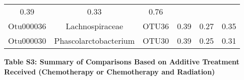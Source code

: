 \documentclass[12pt,]{article}
\begin{document}
\begin{longtable}[]{@{}cccccc@{}}
\begin{minipage}[t]{0.22\columnwidth}
0.39\strut
\end{minipage} & \begin{minipage}[t]{0.17\columnwidth}\centering\strut
0.33\strut
\end{minipage} & \begin{minipage}[t]{0.04\columnwidth}\centering\strut
0.76\strut
\end{minipage}\tabularnewline
\begin{minipage}[t]{0.08\columnwidth}\centering\strut
Otu000036\strut
\end{minipage} & \begin{minipage}[t]{0.17\columnwidth}\centering\strut
Lachnospiraceae\strut
\end{minipage} & \begin{minipage}[t]{0.15\columnwidth}\centering\strut
OTU36\strut
\end{minipage} & \begin{minipage}[t]{0.22\columnwidth}\centering\strut
0.39\strut
\end{minipage} & \begin{minipage}[t]{0.17\columnwidth}\centering\strut
0.27\strut
\end{minipage} & \begin{minipage}[t]{0.04\columnwidth}\centering\strut
0.35\strut
\end{minipage}\tabularnewline
\begin{minipage}[t]{0.08\columnwidth}\centering\strut
Otu000030\strut
\end{minipage} & \begin{minipage}[t]{0.17\columnwidth}\centering\strut
Phascolarctobacterium\strut
\end{minipage} & \begin{minipage}[t]{0.15\columnwidth}\centering\strut
OTU30\strut
\end{minipage} & \begin{minipage}[t]{0.22\columnwidth}\centering\strut
0.39\strut
\end{minipage} & \begin{minipage}[t]{0.17\columnwidth}\centering\strut
0.25\strut
\end{minipage} & \begin{minipage}[t]{0.04\columnwidth}\centering\strut
0.31\strut
\end{minipage}\tabularnewline
\bottomrule
\end{longtable}

\normalsize
\newpage

\textbf{Table S3: Summary of Comparisons Based on Additive Treatment
Received (Chemotherapy or Chemotherapy and Radiation)} \footnotesize
\end{document}
